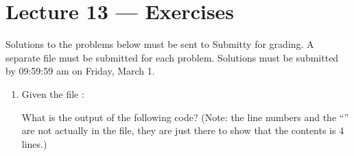 \documentclass[letterpaper,10pt,english]{sphinxmanual}
\begin{document}
\chapter{Lecture 13 — Exercises}
\label{\detokenize{lecture_notes/lec13_files_exercises/exercises:lecture-13-exercises}}\label{\detokenize{lecture_notes/lec13_files_exercises/exercises::doc}}
Solutions to the problems below must be sent to Submitty for grading.
A separate file must be submitted for each problem. Solutions must be
submitted by 09:59:59 am on Friday, March 1.
\begin{enumerate}
\def\theenumi{\arabic{enumi}}
\def\labelenumi{\theenumi .}
\makeatletter\def\p@enumii{\p@enumi \theenumi .}\makeatother
\item {} 
Given the file :

\begin{sphinxVerbatim}[commandchars=\\\{\}]
          
        
          
  
\end{sphinxVerbatim}

What is the output of the following code? (Note: the line
numbers and the “\textbar{}” are not actually in the file, they are just there to show
that the contents is 4 lines.)


\end{enumerate}
\end{document}
